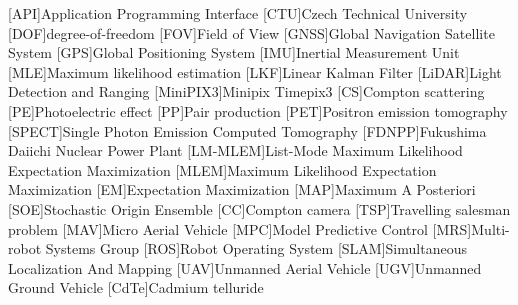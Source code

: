 
\begin{acronym}
  [API]{Application Programming Interface}
  [CTU]{Czech Technical University}
  [DOF]{degree-of-freedom}
  [FOV]{Field of View}
  [GNSS]{Global Navigation Satellite System}
  [GPS]{Global Positioning System}
  [IMU]{Inertial Measurement Unit}
  [MLE]{Maximum likelihood estimation}  
  [LKF]{Linear Kalman Filter}
  [LiDAR]{Light Detection and Ranging}
  [MiniPIX3]{Minipix Timepix3}
  [CS]{Compton scattering}
  [PE]{Photoelectric effect}
  [PP]{Pair production}
  [PET]{Positron emission tomography}
  [SPECT]{Single Photon Emission Computed Tomography}
  [FDNPP]{Fukushima Daiichi Nuclear Power Plant}
  [LM-MLEM]{List-Mode Maximum Likelihood Expectation Maximization}
  [MLEM]{Maximum Likelihood Expectation Maximization}
  [EM]{Expectation Maximization}
  [MAP]{Maximum A Posteriori}
  [SOE]{Stochastic Origin Ensemble}
  [CC]{Compton camera}
  [TSP]{Travelling salesman problem}
  [MAV]{Micro Aerial Vehicle}
  [MPC]{Model Predictive Control}
  [MRS]{Multi-robot Systems Group}
  [ROS]{Robot Operating System}
  [SLAM]{Simultaneous Localization And Mapping}
  [UAV]{Unmanned Aerial Vehicle}
  [UGV]{Unmanned Ground Vehicle}
  [CdTe]{Cadmium telluride}
\end{acronym}
